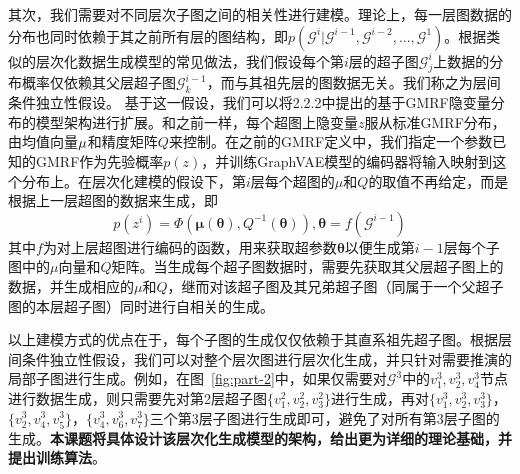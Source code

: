\documentclass[12pt,UTF8,AutoFakeBold=2,a4paper]{ctexart} %
\begin{document}
其次，我们需要对不同层次子图之间的相关性进行建模。理论上，每一层图数据的分布也同时依赖于其之前所有层的图结构，即$p(\mathcal{G}^i|\mathcal{G}^{i-1}, \mathcal{G}^{i-2},...,\mathcal{G}^{1})$。根据类似的层次化数据生成模型的常见做法，我们假设每个第$i$层的超子图$\mathcal{G}^i_j$上数据的分布概率仅依赖其父层超子图$\mathcal{G}^{i-1}_k$，而与其祖先层的图数据无关。我们称之为层间条件独立性假设。%
基于这一假设，我们可以将2.2.2中提出的基于GMRF隐变量分布的模型架构进行扩展。和之前一样，每个超图上隐变量$z$服从标准GMRF分布，由均值向量$\bf{\mu}$和精度矩阵${Q}$来控制。在之前的GMRF定义中，我们指定一个参数已知的GMRF作为先验概率$p(z)$，并训练GraphVAE模型的编码器将输入映射到这个分布上。在层次化建模的假设下，第$i$层每个超图的$\mu$和$Q$的取值不再给定，而是根据上一层超图的数据来生成，即
\begin{equation}
    p(z^i) = \Phi(\mathbf{\mu}(\mathbf{\theta}), Q^{-1}(\mathbf{\theta})), \mathbf{\theta} = f(\mathcal{G}^{i-1})
\end{equation}
其中$f$为对上层超图进行编码的函数，用来获取超参数$\mathbf{\theta}$以便生成第$i-1$层每个子图中的$\mu$向量和$Q$矩阵。当生成每个超子图数据时，需要先获取其父层超子图上的数据，并生成相应的$\mu$和$Q$，继而对该超子图及其兄弟超子图（同属于一个父超子图的本层超子图）同时进行自相关的生成。

以上建模方式的优点在于，每个子图的生成仅仅依赖于其直系祖先超子图。根据层间条件独立性假设，我们可以对整个层次图进行层次化生成，并只针对需要推演的局部子图进行生成。例如，在图~\ref{fig:part-2}中，如果仅需要对$\mathcal{G}^3$中的$v^3_1, v^3_2, v^3_4$节点进行数据生成，则只需要先对第2层超子图$\{v^2_1, v^2_2, v^2_3\}$进行生成，再对$\{v^3_1, v^3_2, v^3_3\}$，$\{v^3_2, v^3_4, v^3_5\}$，$\{v^3_4, v^3_6, v^3_7\}$三个第3层子图进行生成即可，避免了对所有第3层子图的生成。\textbf{本课题将具体设计该层次化生成模型的架构，给出更为详细的理论基础，并提出训练算法}。


\end{document}
